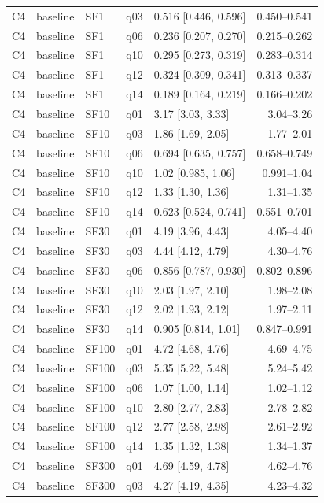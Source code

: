 \begin{longtable}{lllllr}
C4 & baseline & SF1 & q03 & 0.516 [0.446, 0.596] & 0.450--0.541 \\
C4 & baseline & SF1 & q06 & 0.236 [0.207, 0.270] & 0.215--0.262 \\
C4 & baseline & SF1 & q10 & 0.295 [0.273, 0.319] & 0.283--0.314 \\
C4 & baseline & SF1 & q12 & 0.324 [0.309, 0.341] & 0.313--0.337 \\
C4 & baseline & SF1 & q14 & 0.189 [0.164, 0.219] & 0.166--0.202 \\
C4 & baseline & SF10 & q01 & 3.17 [3.03, 3.33] & 3.04--3.26 \\
C4 & baseline & SF10 & q03 & 1.86 [1.69, 2.05] & 1.77--2.01 \\
C4 & baseline & SF10 & q06 & 0.694 [0.635, 0.757] & 0.658--0.749 \\
C4 & baseline & SF10 & q10 & 1.02 [0.985, 1.06] & 0.991--1.04 \\
C4 & baseline & SF10 & q12 & 1.33 [1.30, 1.36] & 1.31--1.35 \\
C4 & baseline & SF10 & q14 & 0.623 [0.524, 0.741] & 0.551--0.701 \\
C4 & baseline & SF30 & q01 & 4.19 [3.96, 4.43] & 4.05--4.40 \\
C4 & baseline & SF30 & q03 & 4.44 [4.12, 4.79] & 4.30--4.76 \\
C4 & baseline & SF30 & q06 & 0.856 [0.787, 0.930] & 0.802--0.896 \\
C4 & baseline & SF30 & q10 & 2.03 [1.97, 2.10] & 1.98--2.08 \\
C4 & baseline & SF30 & q12 & 2.02 [1.93, 2.12] & 1.97--2.11 \\
C4 & baseline & SF30 & q14 & 0.905 [0.814, 1.01] & 0.847--0.991 \\
C4 & baseline & SF100 & q01 & 4.72 [4.68, 4.76] & 4.69--4.75 \\
C4 & baseline & SF100 & q03 & 5.35 [5.22, 5.48] & 5.24--5.42 \\
C4 & baseline & SF100 & q06 & 1.07 [1.00, 1.14] & 1.02--1.12 \\
C4 & baseline & SF100 & q10 & 2.80 [2.77, 2.83] & 2.78--2.82 \\
C4 & baseline & SF100 & q12 & 2.77 [2.58, 2.98] & 2.61--2.92 \\
C4 & baseline & SF100 & q14 & 1.35 [1.32, 1.38] & 1.34--1.37 \\
C4 & baseline & SF300 & q01 & 4.69 [4.59, 4.78] & 4.62--4.76 \\
C4 & baseline & SF300 & q03 & 4.27 [4.19, 4.35] & 4.23--4.32 \\

\end{longtable}
